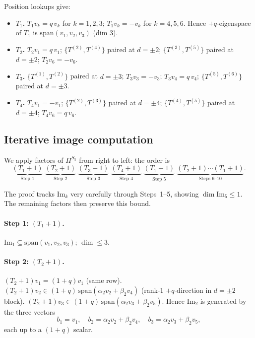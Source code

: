 \documentclass[11pt]{article}
\theoremstyle{definition}
\begin{document}
Position lookups give:
\begin{itemize}[topsep=0.3em,itemsep=0.2em,leftmargin=2em]
\item \textbf{$T_1$.} $T_1 v_k = q\, v_k$ for $k=1,2,3$;
  $T_1 v_k = -v_k$ for $k=4,5,6$.
  Hence $+q$-eigenspace of $T_1$ is $\mathrm{span}(v_1, v_2, v_3)$ (dim $3$).
\item \textbf{$T_2$.}
  $T_2 v_1 = q\, v_1$;
  $\{T^{(2)}, T^{(4)}\}$ paired at $d=\pm 2$;
  $\{T^{(3)}, T^{(5)}\}$ paired at $d=\pm 2$;
  $T_2 v_6 = -v_6$.
\item \textbf{$T_3$.}
  $\{T^{(1)}, T^{(2)}\}$ paired at $d=\pm 3$;
  $T_3 v_3 = -v_3$;
  $T_3 v_4 = q\, v_4$;
  $\{T^{(5)}, T^{(6)}\}$ paired at $d=\pm 3$.
\item \textbf{$T_4$.}
  $T_4 v_1 = -v_1$;
  $\{T^{(2)}, T^{(3)}\}$ paired at $d=\pm 4$;
  $\{T^{(4)}, T^{(5)}\}$ paired at $d=\pm 4$;
  $T_4 v_6 = q\, v_6$.
\end{itemize}

\subsection{Iterative image computation}

We apply factors of $\Pi^{S_5}$ from right to left: the order is
\[
\underbrace{(T_1{+}1)}_{\text{Step 1}}\;
\underbrace{(T_2{+}1)}_{\text{Step 2}}\;
\underbrace{(T_3{+}1)}_{\text{Step 3}}\;
\underbrace{(T_4{+}1)}_{\text{Step 4}}\;
\underbrace{(T_1{+}1)}_{\text{Step 5}}\;
\underbrace{(T_2{+}1)\cdots(T_1{+}1)}_{\text{Steps 6--10}}.
\]

The proof tracks $\mathrm{Im}_k$ very carefully through Steps~1--5,
showing $\dim \mathrm{Im}_5 \leq 1$. The remaining factors then preserve
this bound.

\paragraph{Step 1: $(T_1{+}1)$.}
$\mathrm{Im}_1 \subseteq \mathrm{span}(v_1, v_2, v_3)$; $\dim \leq 3$.

\paragraph{Step 2: $(T_2{+}1)$.}
$(T_2{+}1) v_1 = (1{+}q) v_1$ (same row).
$(T_2{+}1) v_2 \in (1{+}q)\,\mathrm{span}(\alpha_2 v_2 + \beta_2 v_4)$
(rank-1 $+q$-direction in $d{=}\pm 2$ block).
$(T_2{+}1) v_3 \in (1{+}q)\,\mathrm{span}(\alpha_2 v_3 + \beta_2 v_5)$.
Hence $\mathrm{Im}_2$ is generated by the three vectors
\[
b_1 = v_1, \quad
b_2 = \alpha_2 v_2 + \beta_2 v_4, \quad
b_3 = \alpha_2 v_3 + \beta_2 v_5,
\]
each up to a $(1{+}q)$ scalar.
\end{document}
